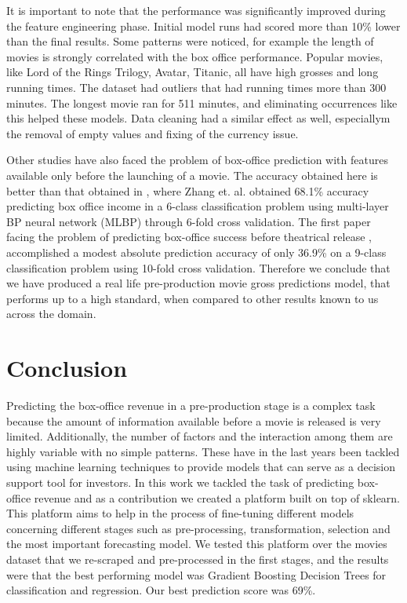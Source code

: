 It is important to note that the performance was significantly improved during the feature engineering phase. Initial model runs had scored more than 10\% lower than the final results. Some patterns were noticed, for example the length of movies is strongly correlated with the box office performance. Popular movies, like Lord of the Rings Trilogy, Avatar, Titanic, all have high grosses and long running times. The dataset had outliers that had running times more than 300 minutes. The longest movie ran for 511 minutes,  and eliminating occurrences like this helped these models. Data cleaning had a similar effect as well, especiallym the removal of empty values and fixing of the currency issue.

Other studies have also faced the problem of box-office prediction with features available only before the launching of a movie. The accuracy obtained here is better than that obtained in \cite{zhang2009forecasting}, where Zhang et. al. obtained 68.1\% accuracy predicting box office income in a 6-class classification problem using multi-layer BP neural network (MLBP) through 6-fold cross validation. The first paper facing the problem of predicting box-office success before theatrical release \cite{sharda2006predicting}, accomplished a modest absolute prediction accuracy of only 36.9\% on a 9-class classification problem using 10-fold cross validation. Therefore we conclude that we have produced a real life pre-production movie gross predictions model, that performs up to a high standard, when compared to other results known to us across the domain.

\section{Conclusion}
Predicting the box-office revenue in a pre-production stage is a complex task because the amount of information available before a movie is released is very limited. Additionally, the number of factors and the interaction among them are highly variable with no simple patterns. These have in the last years been tackled using machine learning techniques to provide models that can serve as a decision support tool for investors. In this work we tackled the task of predicting box-office revenue and as a contribution we created a platform built on top of sklearn. This platform aims to help in the process of fine-tuning different models concerning different stages such as pre-processing, transformation, selection and the most important forecasting model. We tested this platform over the movies dataset that we re-scraped and pre-processed in the first stages, and the results were that the best performing model was Gradient Boosting Decision Trees for classification and regression. Our best prediction score was 69\%. 
